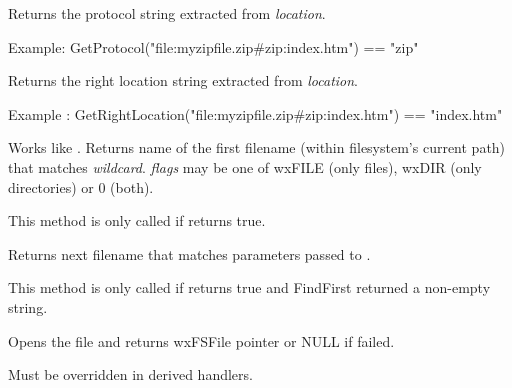 Returns the protocol string extracted from {\it location}. 

Example: GetProtocol("file:myzipfile.zip\#zip:index.htm") == "zip"

\label{wxfilesystemhandlergetrightlocation}


Returns the right location string extracted from {\it location}. 

Example : GetRightLocation("file:myzipfile.zip\#zip:index.htm") == "index.htm"

\label{wxfilesystemhandlerfindfirst}


Works like . Returns name of the first
filename (within filesystem's current path) that matches {\it wildcard}. {\it flags} may be one of
wxFILE (only files), wxDIR (only directories) or 0 (both).

This method is only called if  returns true.

\label{wxfilesystemhandlerfindnext}


Returns next filename that matches parameters passed to .

This method is only called if  returns true and FindFirst
returned a non-empty string.

\label{wxfilesystemhandleropenfile}


Opens the file and returns wxFSFile pointer or NULL if failed.

Must be overridden in derived handlers.





